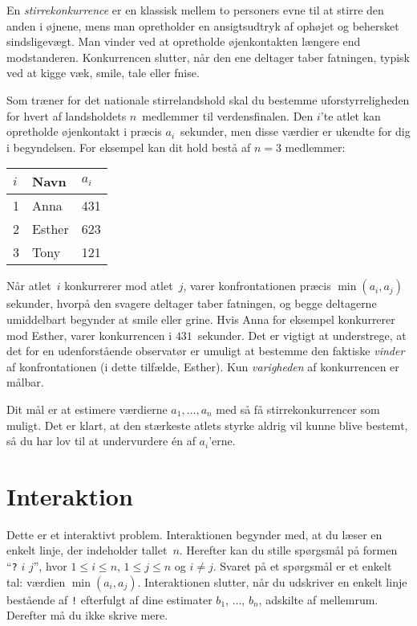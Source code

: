 

En \emph{stirrekonkurrence} er en klassisk mellem to personers evne til at stirre den anden i øjnene, mens man opretholder en ansigtsudtryk af ophøjet og behersket sindsligevægt.
Man vinder ved at opretholde øjenkontakten længere end modstanderen.
Konkurrencen slutter, når den ene deltager taber fatningen, typisk ved at kigge væk, smile, tale eller fnise.

Som træner for det nationale stirre\-lands\-hold skal du bestemme uforstyrreligheden for hvert af landsholdets $n$~medlemmer til verdensfinalen.
Den $i$'te atlet kan opretholde øjenkontakt i præcis $a_i$~sekunder, men disse værdier er ukendte for dig i begyndelsen.
For eksempel kan dit hold bestå af $n=3$ medlemmer:

\medskip
\begin{tabular}{lll}
$i$ & Navn & $a_i$\\\hline
1 & Anna & 431 \\
2 & Esther & 623 \\
3 & Tony & 121
\end{tabular}

\medskip
Når atlet~$i$ konkurrerer mod atlet~$j$, varer konfrontationen præcis $\min(a_i, a_j)$ sekunder, hvorpå den svagere deltager taber fatningen, og begge deltagerne umiddelbart begynder at smile eller grine.
Hvis Anna for eksempel konkurrerer mod Esther, varer konkurrencen i $431$~sekunder.
Det er vigtigt at understrege, at det for en udenforstående observatør er umuligt at bestemme den faktiske \emph{vinder} af konfrontationen (i dette tilfælde, Esther).
Kun \emph{varigheden} af konkurrencen er målbar.

Dit mål er at estimere værdierne $a_1,\ldots, a_n$ med så få stirrekonkurrencer som muligt.
Det er klart, at den stærkeste atlets styrke aldrig vil kunne blive bestemt, så du har lov til at undervurdere én af $a_i$'erne.

\section*{Interaktion}

Dette er et interaktivt problem.
Interaktionen begynder med, at du læser en enkelt linje, der indeholder tallet~$n$.
Herefter kan du stille spørgsmål på formen ``\texttt{?} $i$ $j$'', hvor $1\leq i\leq n$, $1\leq j\leq n$ og $i\neq j$.
Svaret på et spørgsmål er et enkelt tal: værdien $\min(a_i, a_j)$.
Interaktionen slutter, når du udskriver en enkelt linje bestående af \texttt{!} efterfulgt af dine estimater $b_1$, $\ldots$, $b_n$, adskilte af mellemrum.
Derefter må du ikke skrive mere.

